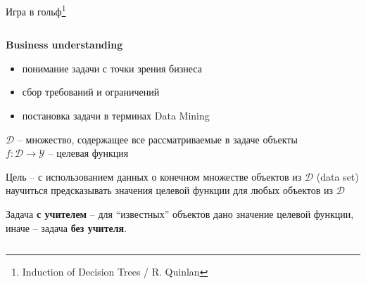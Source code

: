 \documentclass[aspectratio=169]{beamer}
\begin{document}
\begin{frame}{Игра в гольф\footnote{Induction of Decision Trees / R. Quinlan}}

\begin{columns}
    \begin{column}{.7\linewidth}
    \begin{small}
    	{\bf Business understanding}
		\begin{itemize}
		\item понимание задачи с точки зрения бизнеса
		\item сбор требований и ограничений
		\item постановка задачи в терминах Data Mining
		\end{itemize}

		$\mathcal{D}$ -- множество, содержащее все рассматриваемые в задаче объекты \\  \vspace{1em}
		$f: \mathcal{D} \rightarrow \mathcal{Y}$ -- целевая функция \\ \vspace{1em}

		Цель -- с использованием данных о конечном множестве объектов из $\mathcal{D}$ (data set) научиться предсказывать значения целевой функции для любых объектов из $\mathcal{D}$

		\vspace{1em}
		Задача {\bf с учителем} -- для ``известных'' объектов дано значение целевой функции, иначе -- задача {\bf без учителя}.
				\end{small}


\end{column}
\end{columns}
\end{frame}
\end{document}

